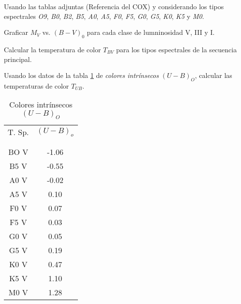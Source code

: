 \documentclass[12pt,a4paper]{practice}
\begin{document}
    \begin{problem}\label{prob:6}
        Usando las tablas adjuntas (Referencia del COX) y considerando los tipos espectrales \emph{O9}, \emph{B0}, \emph{B2}, \emph{B5}, \emph{A0}, \emph{A5}, \emph{F0}, \emph{F5}, \emph{G0}, \emph{G5}, \emph{K0}, \emph{K5} y \emph{M0}.

        \begin{ppart}\label{prob:6:a}
            Graficar $M_V$ vs. $\left(B-V\right)_{0}$ para cada clase de lumninosidad V, III y I.
        \end{ppart}

        \begin{ppart}\label{prob:6:b}
            Calcular la temperatura de color $T_{BV}$ para los tipos espectrales de la secuencia principal.
        \end{ppart}

        \begin{ppart}\label{prob:6:c}
            Usando los datos de la tabla \ref{table:2} de \emph{colores intrínsecos} $\left(U-B\right)_O$, calcular las temperaturas de color $T_{UB}$.
        \end{ppart}

        \begin{table}[h!]
            \centering
            \begin{tabular}{c | c}
                T. Sp.  & $\left(U-B\right)_{o}$ \\
                &  \\[-0.8em]\hline
                &  \\[-0.8em]
                BO V  & -1.06 \\
                B5 V  & -0.55 \\
                A0 V  & -0.02 \\
                A5 V  &  0.10 \\
                F0 V  &  0.07 \\
                F5 V  &  0.03 \\
                G0 V  &  0.05 \\
                G5 V  &  0.19 \\
                K0 V  &  0.47 \\
                K5 V  &  1.10 \\
                M0 V  &  1.28 \\
                \hline
            \end{tabular}
            \caption{
                Colores intrínsecos $\left(U-B\right)_O$
            }\label{table:2}
        \end{table}


\end{problem}
\end{document}
